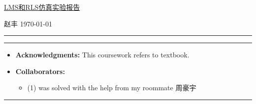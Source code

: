 \documentclass{article}
\begin{document}
\courseheader
\begin{center}
  \underline{LMS和RLS仿真实验报告} \\
\end{center}
\begin{flushleft}
  赵丰\quad \studentID\hfill
  \today
\end{flushleft}
\hrule

\vspace{2em}

\flushleft
\rule{\textwidth}{1pt}
\begin{itemize}
\item {\bf Acknowledgments: \/} 
  This coursework refers to textbook.  
\item {\bf Collaborators: \/}
  \begin{itemize}
  \item (1) was solved with the help from my roommate 周豪宇
  \end{itemize}
\end{itemize}
\rule{\textwidth}{1pt}

\vspace{2em}
\end{document}

